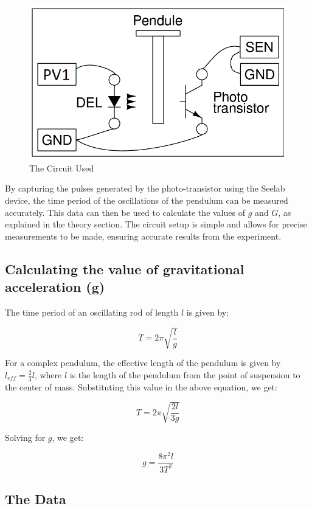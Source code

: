 		\begin{figure}
			\centering
			\includegraphics[width=0.8\columnwidth]{images/circuit.png}
			\caption{The Circuit Used}
			\label{th:2}
		\end{figure}

		By capturing the pulses generated by the photo-transistor using the Seelab device, the time period of the oscillations of the pendulum can be measured accurately. This data can then be used to calculate the values of $g$ and $G$, as explained in the theory section. The circuit setup is simple and allows for precise measurements to be made, ensuring accurate results from the experiment.

	\subsection{Calculating the value of gravitational acceleration (g)}

		The time period of an oscillating rod of length $l$ is given by:
		
		$$T = 2\pi \sqrt{\frac{l}{g}}$$
		
		
		For a complex pendulum, the effective length of the pendulum is given by $l_{eff} = \frac{2}{3}l$, where $l$ is the length of the pendulum from the point of suspension to the center of mass. Substituting this value in the above equation, we get:
		
		$$T = 2\pi \sqrt{\frac{2l}{3g}}$$
		
		
		Solving for $g$, we get:
		

		\begin{equation}
			g = \frac{8\pi^2l}{3T^2}
			\label{eq:1}
		\end{equation}


	
	\subsection{The Data}

